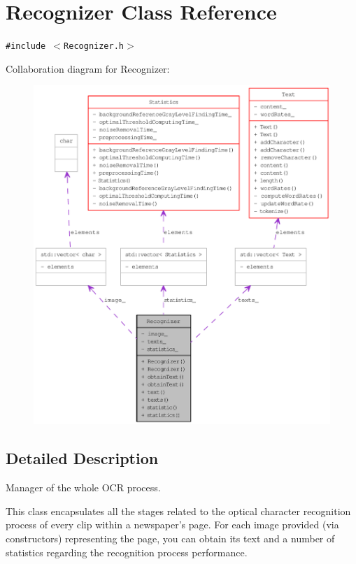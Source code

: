 \hypertarget{class_recognizer}{
\section{Recognizer Class Reference}
\label{class_recognizer}
}
{\tt \#include $<$Recognizer.h$>$}

Collaboration diagram for Recognizer:\nopagebreak
\begin{figure}[H]
\begin{center}
\leavevmode
\includegraphics[width=400pt]{class_recognizer__coll__graph}
\end{center}
\end{figure}


\subsection{Detailed Description}
Manager of the whole OCR process. 

This class encapsulates all the stages related to the optical character recognition process of every clip within a newspaper's page. For each image provided (via constructors) representing the page, you can obtain its text and a number of statistics regarding the recognition process performance.

